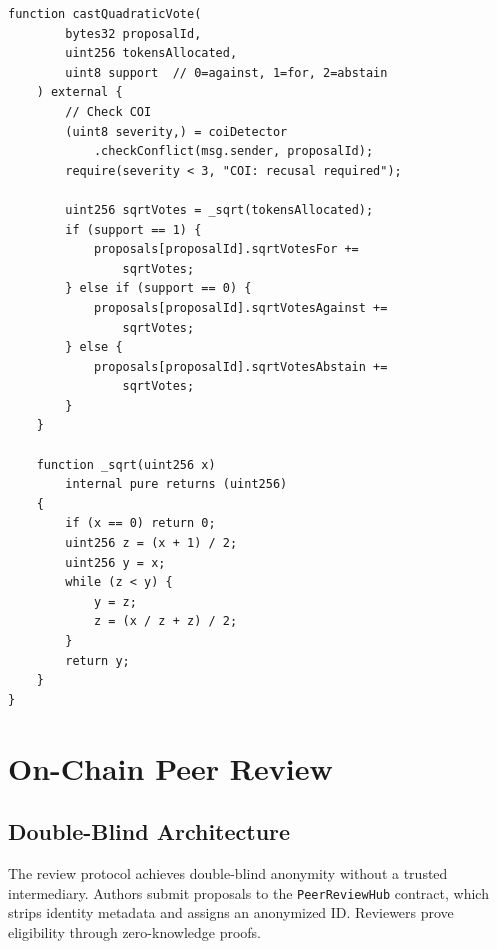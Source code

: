 \documentclass[11pt,letterpaper]{article}
\begin{document}
\begin{lstlisting}[language=Solidity,caption=ResearchDAO core contract]
    function castQuadraticVote(
        bytes32 proposalId,
        uint256 tokensAllocated,
        uint8 support  // 0=against, 1=for, 2=abstain
    ) external {
        // Check COI
        (uint8 severity,) = coiDetector
            .checkConflict(msg.sender, proposalId);
        require(severity < 3, "COI: recusal required");

        uint256 sqrtVotes = _sqrt(tokensAllocated);
        if (support == 1) {
            proposals[proposalId].sqrtVotesFor +=
                sqrtVotes;
        } else if (support == 0) {
            proposals[proposalId].sqrtVotesAgainst +=
                sqrtVotes;
        } else {
            proposals[proposalId].sqrtVotesAbstain +=
                sqrtVotes;
        }
    }

    function _sqrt(uint256 x)
        internal pure returns (uint256)
    {
        if (x == 0) return 0;
        uint256 z = (x + 1) / 2;
        uint256 y = x;
        while (z < y) {
            y = z;
            z = (x / z + z) / 2;
        }
        return y;
    }
}
\end{lstlisting}

\section{On-Chain Peer Review}
\label{sec:review}

\subsection{Double-Blind Architecture}

The review protocol achieves double-blind anonymity without a trusted intermediary. Authors submit proposals to the \texttt{PeerReviewHub} contract, which strips identity metadata and assigns an anonymized ID. Reviewers prove eligibility through zero-knowledge proofs.
\end{document}
